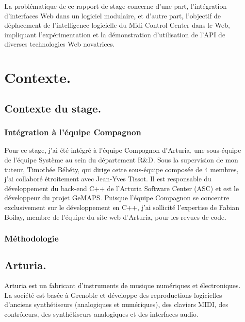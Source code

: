 \documentclass[francais]{rapportPFE}  %
\begin{document}
La problématique de ce rapport de stage concerne d'une part, l'intégration d'interfaces Web dans un logiciel modulaire, et d'autre part, l'objectif de déplacement de l'intelligence logicielle du Midi Control Center dans le Web, impliquant l'expérimentation et la démonstration d'utilisation de l'API de diverses technologies Web novatrices.



\section{Contexte.}

\subsection{Contexte du stage.}
\subsubsection{Intégration à l'équipe Compagnon}
Pour ce stage, j'ai été intégré à l'équipe Compagnon d'Arturia, une sous-équipe de l'équipe Système au sein du département R\&D. Sous la supervision de mon tuteur, Timothée Béhéty, qui dirige cette sous-équipe composée de 4 membres, j'ai collaboré étroitement avec Jean-Yves Tissot. Il est responsable du développement du back-end C++ de l'Arturia Software Center (ASC) et est le développeur du projet GeMAPS. Puisque l'équipe Compagnon se concentre exclusivement sur le développement en C++, j'ai sollicité l'expertise de Fabian Boilay, membre de l'équipe du site web d'Arturia, pour les revues de code.

\subsubsection{Méthodologie}



\subsection{Arturia.}

Arturia est un fabricant d'instruments de musique numériques et électroniques. La société est basée à Grenoble et développe des reproductions logicielles d'anciens synthétiseurs (analogiques et numériques), des claviers MIDI, des contrôleurs, des synthétiseurs analogiques et des interfaces audio. 
\end{document}
